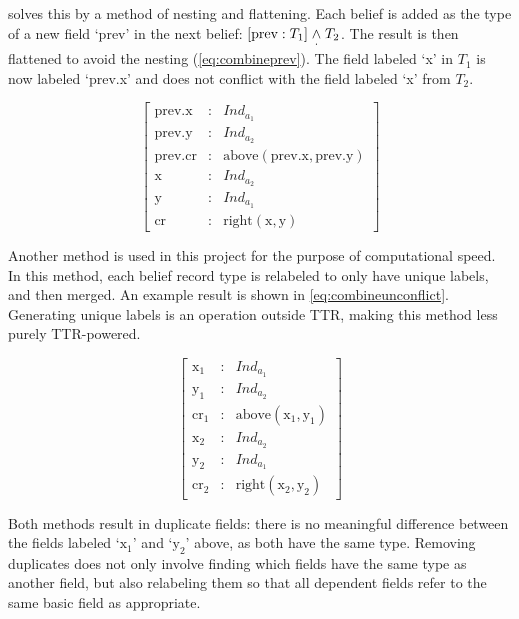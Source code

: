 \cite{CooperTypetheorylanguage2016} solves this by a method of nesting and flattening.
Each belief is added as the type of a new field `prev' in the next belief: $[\text{prev} : T_1] \mathrel{\underset\cdot\wedge} T_2$.
The result is then flattened to avoid the nesting (\autoref{eq:combineprev}).
The field labeled `x' in $T_1$ is now labeled `prev.x' and does not conflict with the field labeled `x' from $T_2$.

\begin{equation} \label{eq:combineprev}
\left[\begin{array}{rcl}
    \text{prev.x} &:& Ind_{a_1} \\
    \text{prev.y} &:& Ind_{a_2} \\
    \text{prev.cr} &:& \text{above}(\text{prev.x}, \text{prev.y}) \\
    \text{x} &:& Ind_{a_2} \\
    \text{y} &:& Ind_{a_1} \\
    \text{cr} &:& \text{right}(\text{x}, \text{y})
    \end{array}\right]
\end{equation}

Another method is used in this project for the purpose of computational speed.
In this method, each belief record type is relabeled to only have unique labels, and then merged.
An example result is shown in \autoref{eq:combineunconflict}.
Generating unique labels is an operation outside TTR, making this method less purely TTR-powered.

\begin{equation} \label{eq:combineunconflict}
\left[\begin{array}{rcl}
    \text{x}_1 &:& Ind_{a_1} \\
    \text{y}_1 &:& Ind_{a_2} \\
    \text{cr}_1 &:& \text{above}(\text{x}_1, \text{y}_1) \\
    \text{x}_2 &:& Ind_{a_2} \\
    \text{y}_2 &:& Ind_{a_1} \\
    \text{cr}_2 &:& \text{right}(\text{x}_2, \text{y}_2)
    \end{array}\right]
\end{equation}

Both methods result in duplicate fields: there is no meaningful difference between the fields labeled `$\text{x}_1$' and `$\text{y}_2$' above, as both have the same type.
Removing duplicates does not only involve finding which fields have the same type as another field, but also relabeling them so that all dependent fields refer to the same basic field as appropriate.

